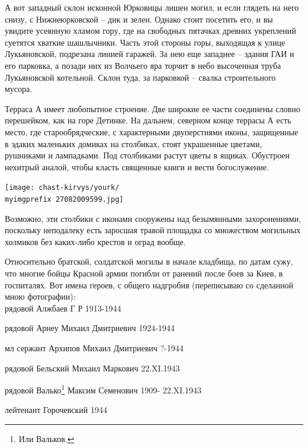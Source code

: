 А вот западный склон исконной Юрковицы лишен могил, и если глядеть на него снизу, с Нижнеюрковской – дик и зелен. Однако стоит посетить его, и вы увидите усеянную хламом гору, где на свободных пятачках древних укреплений суетятся хваткие шашлычники. Часть этой стороны горы, выходящая к улице Лукьяновской, подрезана линией гаражей. За нею еще западнее – здания ГАИ и его парковка, а позади них из Волчьего яра торчит в небо высоченная труба Лукьяновской котельной. Склон туда, за парковкой – свалка строительного мусора.

Терраса А имеет любопытное строение. Две широкие ее части соединены словно перешейком, как на горе Детинке. На дальнем, северном конце террасы А есть место, где старообрядческие, с характерными двуперстиями иконы, защищенные в эдаких маленьких домиках на столбиках, стоят украшенные цветами, рушниками и лампадками. Под столбиками растут цветы в ящиках. Обустроен нехитрый аналой, чтобы класть священные книги и вести богослужение.

\begin{center}
\texttt{[image: chast-kirvys/yourk/\\myimgprefix 27082009599.jpg]}
\end{center} 



Возможно, эти столбики с иконами сооружены над безымянными захоронениями, поскольку неподалеку есть заросшая травой площадка со множеством могильных холмиков без каких-либо крестов и оград вообще.

Относительно братской, солдатской могилы в начале кладбища, по датам сужу, что многие бойцы Красной армии погибли от ранений после боев за Киев, в госпиталях. Вот имена героев, с общего надгробия (переписываю со сделанной мною фотографии):\\

\noindent
рядовой Алжбаев Г Р 1913-1944

\noindent
рядовой Арнеу Михаил Дмитриевич 1924-1944

\noindent
мл сержант Архипов Михаил Дмитриевич ?-1944

\noindent
рядовой Бельский Михаил Маркович 22.XI.1943

\noindent
рядовой Валько\footnote{Или Вальков.} Максим Семенович 1909- 22.XI.1943

\noindent
лейтенант Горочевский 1944

